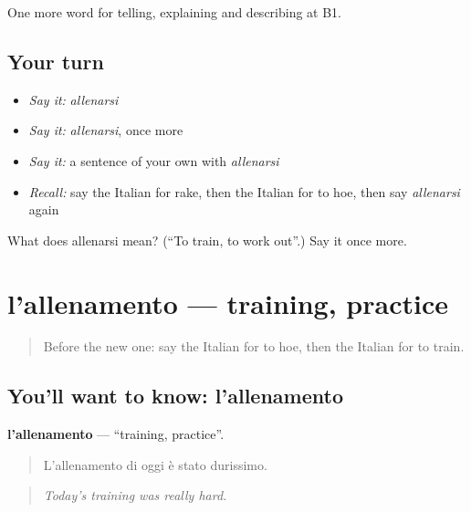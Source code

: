 \begin{grammarlens}[title={What you've built}]
One more word for telling, explaining and describing at B1.
\end{grammarlens}

\subsection*{Your turn}
\begin{itemize}
\raggedright
  \item \emph{Say it:} \emph{allenarsi}
  \item \emph{Say it:} \emph{allenarsi}, once more
  \item \emph{Say it:} a sentence of your own with \emph{allenarsi}
  \item \emph{Recall:} say the Italian for rake, then the Italian for to hoe, then say \emph{allenarsi} again
\end{itemize}

\begin{tcolorbox}[breakable,colback=teal!4,colframe=teal!35!black,title={Before you move on}]
What does allenarsi mean? (\textquotedblleft{}To train, to work out\textquotedblright{}.) Say it once more.
\end{tcolorbox}
\section[l'allenamento]{l'allenamento — training, practice}

\label{lesson:IT-C508-allenamento}



\begin{quote}
Before the new one: say the Italian for to hoe, then the Italian for to train.
\end{quote}

\subsection*{You'll want to know: l'allenamento}
\textbf{l'allenamento} — \textquotedblleft{}training, practice\textquotedblright{}.

\begin{quote}
L'allenamento di oggi è stato durissimo.
\end{quote}

\begin{quote}
\emph{Today's training was really hard.}
\end{quote}

